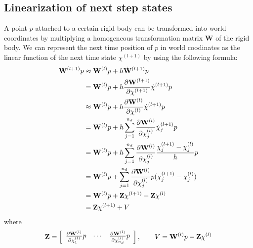 \documentclass[a4paper,10pt]{article}
\begin{document}
\subsection{Linearization of next step states}
A point $p$ attached to a certain rigid body can be transformed into
world coordinates by multiplying a homogeneous transformation matrix $\mathbf{W}$
of the rigid body.
We can represent the next time position of $p$ in world coodinates
as the linear function of the next time state $\chi^{(l+1)}$
by using the following formula:
\begin{align}
\mathbf{W}^{(l+1)}p
        & \approx \mathbf{W}^{(l)}p + h\dot{\mathbf{W}}^{(l+1)}p\notag\\
        &    =    \mathbf{W}^{(l)}p + h\frac{\partial\mathbf{W}^{(l+1)}}{\partial\chi^{(l+1)}}\dot\chi^{(l+1)} p\notag\\
        & \approx \mathbf{W}^{(l)}p + h\frac{\partial\mathbf{W}^{(l  )}}{\partial\chi^{(l  )}}\dot\chi^{(l+1)} p\notag\\
        &    =    \mathbf{W}^{(l)}p + h\sum^{n_d}_{j=1}{ \frac{\partial\mathbf{W}^{(l  )}}{\partial\chi^{(l  )}_j}\dot\chi^{(l+1)}_j} p\notag\\
        &    =    \mathbf{W}^{(l)}p + h\sum^{n_d}_{j=1}{ \frac{\partial\mathbf{W}^{(l  )}}{\partial\chi^{(l  )}_j}\frac{\chi^{(l+1)}_j-\chi^{(l)}_j}{h}} p\notag\\
        &    =    \mathbf{W}^{(l)}p +  \sum^{n_d}_{j=1}{ \frac{\partial\mathbf{W}^{(l  )}}{\partial\chi^{(l  )}_j} p (\chi^{(l+1)}_j-\chi^{(l)}_j})\notag\\
        &    =    \mathbf{W}^{(l)}p + \mathbf{Z}\chi^{(l+1)} - \mathbf{Z}\chi^{(l)}\notag\\
        &    =    \mathbf{Z}\chi^{(l+1)} + V
\end{align}
where
\begin{equation}
\mathbf{Z} = \left[ \begin{array}{ccc}
                    \frac{\partial\mathbf{W}^{(l  )}}{\partial\chi^{(l  )}_1} p & \cdots & \frac{\partial\mathbf{W}^{(l  )}}{\partial\chi^{(l  )}_{n_d}} p
              \end{array} \right], \quad\quad
V = \mathbf{W}^{(l)}p - \mathbf{Z}\chi^{(l)}\notag
\end{equation}

\pagebreak
\end{document}
